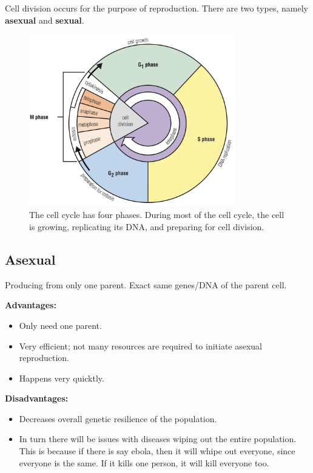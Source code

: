 \documentclass[12pt]{report}
\begin{document}
Cell division occurs for the purpose of reproduction. There are two types, namely \textbf{asexual} and \textbf{sexual}.

\begin{figure}[H]
\centering
    \includegraphics[width=0.8\textwidth]{../figures/cell cycle.png}
    \caption{The cell cycle has four phases. During most of the cell cycle, the cell is growing, replicating its DNA, and preparing for cell division.}
    \label{fig:cell-cycle}
\end{figure}

\subsection{Asexual}
\begin{definition}[Asexual]
    Producing from only one parent. Exact same genes/DNA of the parent cell.
\end{definition}

\textbf{Advantages:}
\begin{itemize}
    \item{Only need one parent.}
    \item{Very efficient; not many resources are required to initiate asexual reproduction.}
    \item{Happens very quicktly.}
\end{itemize}

\textbf{Disadvantages:}
\begin{itemize}
    \item{Decreases overall genetic resilience of the population.}
    \item{In turn there will be issues with diseases wiping out the entire population. This is because if there is say ebola, then it will whipe out everyone, since everyone is the same. If it kills one person, it will kill everyone too.}
\end{itemize}
\end{document}
